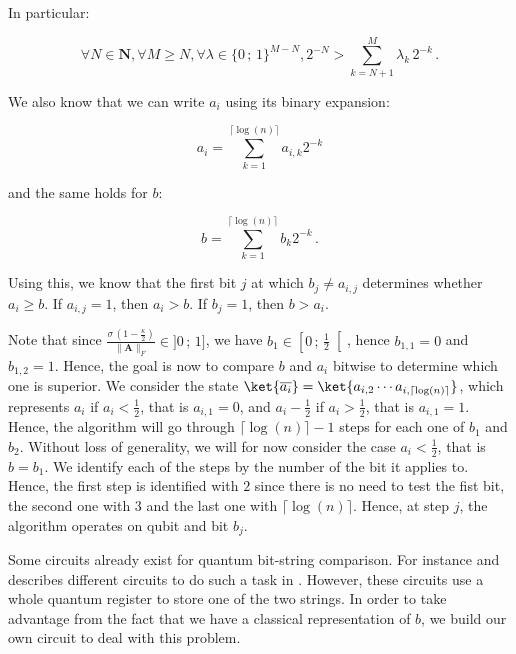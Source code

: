 \documentclass[11pt, a4paper]{article}
\begin{document}
                In particular:
                
                \[\forall N\in\mathbf{N},\forall M\geqslant N,\forall \lambda\in\{0\,;\,1\}^{M-N},2^{-N}>\sum_{k=N+1}^M\lambda_k\,2^{-k}\,.\]
                
                We also know that we can write \(a_i\) using its binary expansion:
                
                \[a_i=\sum_{k=1}^{\lceil\log(n)\rceil}a_{i,k}2^{-k}\]
                
                and the same holds for \(b\):
                
                \[b=\sum_{k=1}^{\lceil\log(n)\rceil}b_{k}2^{-k}\,.\]
                
                Using this, we know that the first bit \(j\) at which \(b_j\neq a_{i,j}\) determines whether \(a_i\geqslant b\). If \(a_{i,j}=1\), then \(a_i>b\). If \(b_j=1\), then \(b>a_i\).
                
                Note that since \(\frac{\sigma\,\left(1 - \frac\kappa2\right)}{\|\mathbf{A}\|_F}\in]0\,;\,1]\), we have \(b_1\in\left[0\,;\,\frac12\right[\), hence \(b_{1,1}=0\) and \(b_{1,2}=1\). Hence, the goal is now to compare \(b\) and \(a_i\) bitwise to determine which one is superior. We consider the state \(\ket{\overline{a_i}} = \ket{a_{i,2}\cdots a_{i,\lceil\log(n)\rceil}}\), which represents \(a_i\) if \(a_i<\frac12\), that is \(a_{i,1}=0\), and \(a_i-\frac12\) if \(a_i>\frac12\), that is \(a_{i, 1} = 1\). Hence, the algorithm will go through \(\lceil\log(n)\rceil - 1\) steps for each one of \(b_1\) and \(b_2\). Without loss of generality, we will for now consider the case \(a_i<\frac12\), that is \(b=b_1\). We identify each of the steps by the number of the bit it applies to. Hence, the first step is identified with \(2\) since there is no need to test the fist bit, the second one with \(3\) and the last one with \(\lceil\log(n)\rceil\). Hence, at step \(j\), the algorithm operates on qubit  and bit \(b_j\).
                
                Some circuits already exist for quantum bit-string comparison. For instance \citeauthor{QBSC} and describes different circuits to do such a task in \cite{QBSC}. However, these circuits use a whole quantum register to store one of the two strings. In order to take advantage from the fact that we have a classical representation of \(b\), we build our own circuit to deal with this problem.
                
\end{document}

